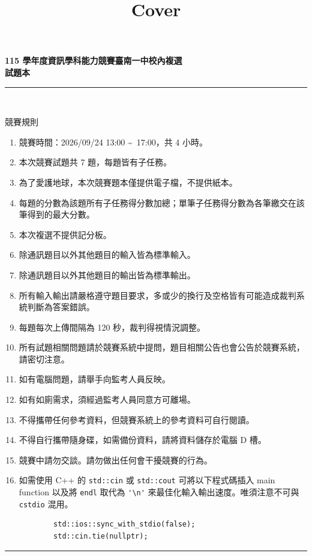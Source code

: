 \documentclass[a4paper]{article}
\title{Cover}
\begin{document}
\begin{center}
\textbf{\huge 115 學年度資訊學科能力競賽臺南一中校內複選\\ 試題本}\\
\vspace{10mm}
\rule{17cm}{2pt}\\
\vspace{5mm}

\huge 競賽規則\\
\end{center}

\fontsize{14pt}{20pt}\selectfont
\begin{enumerate}
    \setlength\itemsep{0.5pt}
    \item 競賽時間：2026/09/24 13:00 \textasciitilde \, 17:00，共 4 小時。
    \item 本次競賽試題共 7 題，每題皆有子任務。
    \item 為了愛護地球，本次競賽題本僅提供電子檔，不提供紙本。
    \item 每題的分數為該題所有子任務得分數加總；單筆子任務得分數為各筆繳交在該筆得到的最大分數。
    \item 本次複選不提供記分板。
    \item 除通訊題目以外其他題目的輸入皆為標準輸入。
    \item 除通訊題目以外其他題目的輸出皆為標準輸出。
    \item 所有輸入輸出請嚴格遵守題目要求，多或少的換行及空格皆有可能造成裁判系統判斷為答案錯誤。
    \item 每題每次上傳間隔為 120 秒，裁判得視情況調整。
    \item 所有試題相關問題請於競賽系統中提問，題目相關公告也會公告於競賽系統，請密切注意。
    \item 如有電腦問題，請舉手向監考人員反映。
    \item 如有如廁需求，須經過監考人員同意方可離場。
    \item 不得攜帶任何參考資料，但競賽系統上的參考資料可自行閱讀。
    \item 不得自行攜帶隨身碟，如需備份資料，請將資料儲存於電腦 D 槽。
    \item 競賽中請勿交談。請勿做出任何會干擾競賽的行為。
    \item 如需使用 C++ 的 \lstinline{std::cin} 或 \lstinline{std::cout} 可將以下程式碼插入 main function 以及將 \lstinline{endl} 取代為 \lstinline{'\n'} 來最佳化輸入輸出速度。唯須注意不可與 \lstinline{cstdio} 混用。
        \begin{lstlisting}
        std::ios::sync_with_stdio(false);
        std::cin.tie(nullptr);
        \end{lstlisting}

\end{enumerate}

\begin{center}
\rule{17cm}{2pt}\\
\end{center}
\end{document}
